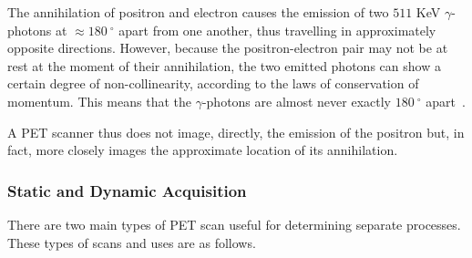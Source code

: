                 The annihilation of positron and electron causes the emission of two $511$ \gls{KeV} $\gamma$-photons at $\approx\SI{180}{^{\circ}}$ apart from one another, thus travelling in approximately opposite directions. However, because the positron-electron pair may not be at rest at the moment of their annihilation, the two emitted photons can show a certain degree of non-collinearity, according to the laws of conservation of momentum. This means that the $\gamma$-photons are almost never exactly $\SI{180}{^{\circ}}$ apart~\parencite{scienceofpetspringer}. %
                
                A \gls{PET} scanner thus does not image, directly, the emission of the positron but, in fact, more closely images the approximate location of its annihilation. %
            
            \subsubsection{Static and Dynamic Acquisition} \label{sec:static_and_dynamic_acquisition}
                There are two main types of \gls{PET} scan useful for determining separate processes. These types of scans and uses are as follows.
                
